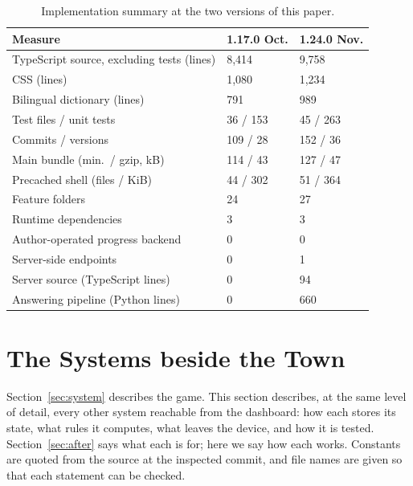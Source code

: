 \documentclass[sigconf,nonacm]{acmart}
\begin{document}
\begin{table}[t]
  \caption{Implementation summary at the two versions of this paper.}
  \label{tab:metrics}
  \small
  \begin{tabular}{@{}p{}p{}p{}@{}}
    \toprule
    Measure & 1.17.0\newline 28 Oct. & 1.24.0\newline 24 Nov. \\
    \midrule
    TypeScript source, excluding tests (lines) & 8{,}414 & 9{,}758 \\
    CSS (lines) & 1{,}080 & 1{,}234 \\
    Bilingual dictionary (lines) & 791 & 989 \\
    Test files / unit tests & 36 / 153 & 45 / 263 \\
    Commits / versions & 109 / 28 & 152 / 36 \\
    Main bundle (min.\ / gzip, kB) & 114 / 43 & 127 / 47 \\
    Precached shell (files / KiB) & 44 / 302 & 51 / 364 \\
    Feature folders & 24 & 27 \\
    Runtime dependencies & 3 & 3 \\
    Author-operated progress backend & 0 & 0 \\
    Server-side endpoints & 0 & 1 \\
    Server source (TypeScript lines) & 0 & 94 \\
    Answering pipeline (Python lines) & 0 & 660 \\
    \bottomrule
  \end{tabular}
\end{table}

\section{The Systems beside the Town}\label{sec:products}
Section~\ref{sec:system} describes the game. This section describes, at the same level of
detail, every other system reachable from the dashboard: how each stores its state, what rules
it computes, what leaves the device, and how it is tested. Section~\ref{sec:after} says what
each is for; here we say how each works. Constants are quoted from the source at the inspected
commit, and file names are given so that each statement can be checked.
\end{document}
